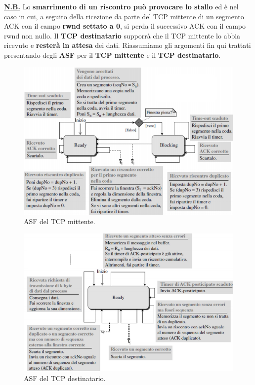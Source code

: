 \documentclass[11pt,a4paper]{article}
\theoremstyle{definition}
\begin{document}
\textbf{\underline{N.B.}} Lo \textbf{smarrimento di un riscontro può provocare lo stallo} ed è nel caso in cui, a seguito della ricezione da parte del TCP mittente di un segmento ACK con  il campo \textbf{rwnd settato a 0}, si perda il successivo ACK con il campo rwnd non nullo. Il \textbf{TCP destinatario} supporrà che il TCP mittente lo abbia ricevuto e \textbf{resterà in attesa} dei dati.
\newpage
Riassumiamo gli argomenti fin qui trattati presentando degli \textbf{ASF} per il \textbf{TCP mittente} e il \textbf{TCP destinatario}.
\begin{figure}[!h]
	\includegraphics[scale=0.47]{Immagini/ASF_tcpm.png}
	\centering
	\caption{ASF del TCP mittente.}
\end{figure}
\begin{figure}[!h]
	\includegraphics[scale=0.47]{Immagini/ASF_tcpd.png}
	\centering
	\caption{ASF del TCP destinatario.}
\end{figure}
\end{document}
